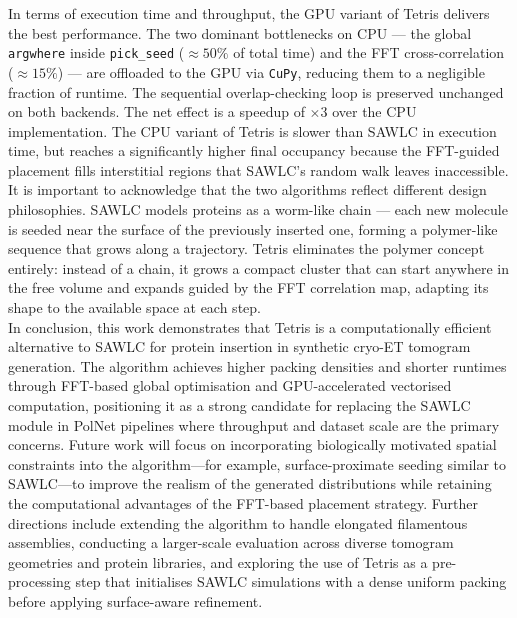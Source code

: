 In terms of execution time and throughput, the GPU variant of Tetris delivers the best
performance. The two dominant bottlenecks on CPU — the global \texttt{argwhere} inside
\texttt{pick\_seed} ($\approx 50\%$ of total time) and the FFT cross-correlation ($\approx 15\%$) — are
offloaded to the GPU via \texttt{CuPy}, reducing them to a negligible fraction of runtime.
The sequential overlap-checking loop is preserved unchanged on both backends. The net effect
is a speedup of $\times3$ over the CPU implementation. The CPU variant of Tetris is slower
than SAWLC in execution time, but reaches a significantly higher final occupancy because the
FFT-guided placement fills interstitial regions that SAWLC's random walk leaves inaccessible.\\

It is important to acknowledge that the two algorithms reflect different design philosophies.
SAWLC models proteins as a worm-like chain — each new molecule is seeded near the surface of
the previously inserted one, forming a polymer-like sequence that grows along a trajectory.
Tetris eliminates the polymer concept entirely: instead of a chain, it grows a compact cluster
that can start anywhere in the free volume and expands guided by the FFT correlation map,
adapting its shape to the available space at each step.\\

In conclusion, this work demonstrates that Tetris is a computationally efficient alternative
to SAWLC for protein insertion in synthetic cryo-ET tomogram generation. The algorithm achieves
higher packing densities and shorter runtimes through FFT-based global optimisation and
GPU-accelerated vectorised computation, positioning it as a strong candidate for replacing the
SAWLC module in PolNet pipelines where throughput and dataset scale are the primary concerns.
Future work will focus on incorporating biologically motivated spatial constraints into the
algorithm—for example, surface-proximate seeding similar to SAWLC—to improve the realism of
the generated distributions while retaining the computational advantages of the FFT-based
placement strategy. Further directions include extending the algorithm to handle elongated
filamentous assemblies, conducting a larger-scale evaluation across diverse tomogram geometries
and protein libraries, and exploring the use of Tetris as a pre-processing step that
initialises SAWLC simulations with a dense uniform packing before applying surface-aware
refinement.\\